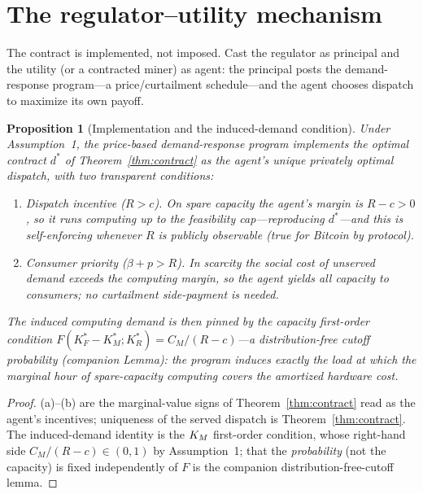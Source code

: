 \documentclass[11pt,reqno]{amsart}
\theoremstyle{plain}
\newtheorem{proposition}{Proposition}
\theoremstyle{definition}
\theoremstyle{remark}
\newcommand{\KRs}{K_R^{*}}\newcommand{\KFs}{K_F^{*}}\newcommand{\KMs}{K_M^{*}}
\newcommand{\CM}{C_M}\newcommand{\CF}{C_F}\newcommand{\CR}{C_R}
\newcommand{\bp}{\beta+p}
\newcommand{\dstar}{d^{*}}
\begin{document}
\section{The regulator--utility mechanism}\label{sec:pa}

The contract is implemented, not imposed. Cast the regulator as principal and the
utility (or a contracted miner) as agent: the principal posts the demand-response
program---a price/curtailment schedule---and the agent chooses dispatch to
maximize its own payoff.

\begin{proposition}[Implementation and the induced-demand condition]\label{prop:pa}
Under Assumption~1, the price-based demand-response program implements the optimal
contract $\dstar$ of Theorem~\ref{thm:contract} as the agent's \emph{unique}
privately optimal dispatch, with two transparent conditions:
\begin{enumerate}[label=(\alph*),leftmargin=2.2em]
  \item \emph{Dispatch incentive ($R>c$).} On spare capacity the agent's margin is
        $R-c>0$, so it runs computing up to the feasibility cap---reproducing
        $\dstar$---and this is self-enforcing whenever $R$ is publicly observable
        (true for Bitcoin by protocol).
  \item \emph{Consumer priority ($\bp>R$).} In scarcity the social cost of unserved
        demand exceeds the computing margin, so the agent yields all capacity to
        consumers; no curtailment side-payment is needed.
\end{enumerate}
The induced computing demand is then pinned by the capacity first-order condition
$F(\KFs-\KMs;\KRs)=\CM/(R-c)$---a \emph{distribution-free} cutoff probability
(companion Lemma): the program induces exactly the load at which the marginal
hour of spare-capacity computing covers the amortized hardware cost.
\end{proposition}

\begin{proof}
(a)--(b) are the marginal-value signs of Theorem~\ref{thm:contract} read as the
agent's incentives; uniqueness of the served dispatch is
Theorem~\ref{thm:contract}. The induced-demand identity is the $K_M$ first-order
condition, whose right-hand side $\CM/(R-c)\in(0,1)$ by Assumption~1; that the
\emph{probability} (not the capacity) is fixed independently of $F$ is the
companion distribution-free-cutoff lemma.
\end{proof}
\end{document}
